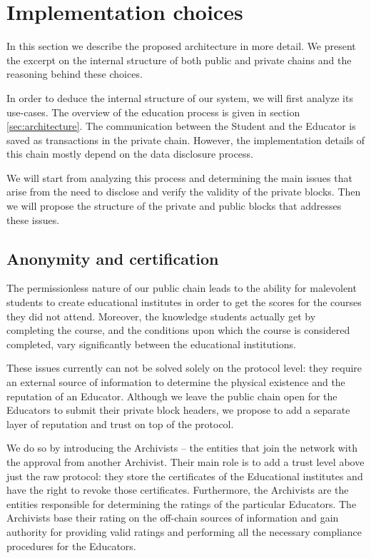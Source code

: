 \section{Implementation choices}
In this section we describe the proposed architecture in more detail. We present the excerpt on the internal structure of both public and private chains and the reasoning behind these choices.

In order to deduce the internal structure of our system, we will first analyze its use-cases. The overview of the education process is given in section \ref{sec:architecture}. The communication between the Student and the Educator is saved as transactions in the private chain. However, the implementation details of this chain mostly depend on the data disclosure process.

We will start from analyzing this process and determining the main issues that arise from the need to disclose and verify the validity of the private blocks. Then we will propose the structure of the private and public blocks that addresses these issues.

\subsection{Anonymity and certification}
\label{sec:cert}
The permissionless nature of our public chain leads to the ability for malevolent students to create educational institutes in order to get the scores for the courses they did not attend. Moreover, the knowledge students actually get by completing the course, and the conditions upon which the course is considered completed, vary significantly between the educational institutions. 

These issues currently can not be solved solely on the protocol level: they require an external source of information to determine the physical existence and the reputation of an Educator. Although we leave the public chain open for the Educators to submit their private block headers, we propose to add a separate layer of reputation and trust on top of the protocol.

We do so by introducing the Archivists -- the entities that join the network with the approval from another Archivist. Their main role is to add a trust level above just the raw protocol: they store the certificates of the Educational institutes and have the right to revoke those certificates. Furthermore, the Archivists are the entities responsible for determining the ratings of the particular Educators. The Archivists base their rating on the off-chain sources of information and gain authority for providing valid ratings and performing all the necessary compliance procedures for the Educators.

